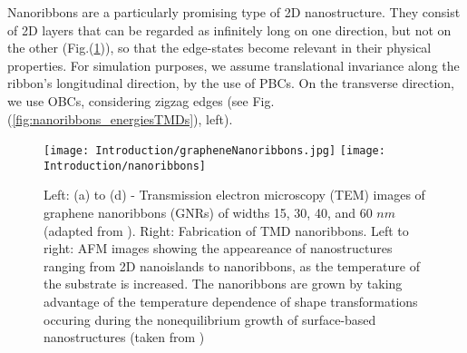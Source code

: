 Nanoribbons are a particularly promising type of \acs{2D} nanostructure.
They consist of \ac{2D} layers that can be regarded as infinitely long on one direction, but not on the other (Fig.(\ref{fig:graphNanoFabricationTMD})), so that the edge-states become relevant in their physical properties.
For simulation purposes, we assume translational invariance along the ribbon's longitudinal direction, by the use of \acp{PBC}.
On the transverse direction, we use \acp{OBC},  considering zigzag edges (see Fig.(\ref{fig:nanoribbons_energiesTMDs}), left).
\begin{figure}[H]
\texttt{[image: Introduction/grapheneNanoribbons.jpg]}
\texttt{[image: Introduction/nanoribbons]}
\caption[(TEM) images of graphene nanoribbons. Fabrication of \ac{TMD} nanoribbons.]{Left: (a) to (d) - Transmission electron microscopy (TEM) images of graphene nanoribbons (GNRs) of widths 15, 30, 40, and 60 $nm$ (adapted from \cite{mohanty_nanotomy-based_2012}). Right: Fabrication of \ac{TMD} nanoribbons. Left to right: \ac{AFM} images showing the appeareance of nanostructures ranging from \ac{2D} nanoislands to nanoribbons, as the temperature of the substrate is increased. The nanoribbons are grown by taking advantage of the temperature dependence of shape transformations occuring during the nonequilibrium growth of surface-based nanostructures (taken from \cite{chen_fabrication_2017})}
\label{fig:graphNanoFabricationTMD}
\end{figure}

